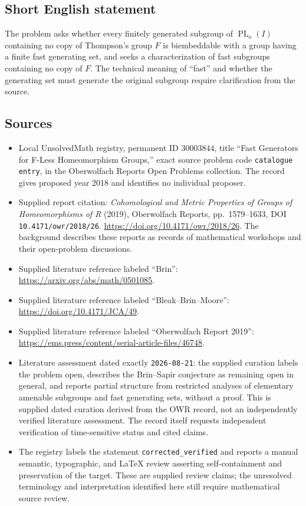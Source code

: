 \documentclass[11pt]{article}
\begin{document}
\subsection{Short English statement}
The problem asks whether every finitely generated subgroup of \(\operatorname{PL}_o(I)\) containing no copy of Thompson's group \(F\) is biembeddable with a group having a finite fast generating set, and seeks a characterization of fast subgroups containing no copy of \(F\). The technical meaning of ``fast'' and whether the generating set must generate the original subgroup require clarification from the source.
\subsection{Sources}
\begin{itemize}
\item Local UnsolvedMath registry, permanent ID \(30003844\), title ``Fast Generators for F-Less Homeomorphism Groups,'' exact source problem code \texttt{catalogue entry}, in the Oberwolfach Reports Open Problems collection. The record gives proposed year 2018 and identifies no individual proposer.
\item Supplied report citation: \emph{Cohomological and Metric Properties of Groups of Homeomorphisms of R} (2019), Oberwolfach Reports, pp.\ 1579--1633, DOI \texttt{10.4171/owr/2018/26}. \url{https://doi.org/10.4171/owr/2018/26}. The background describes these reports as records of mathematical workshops and their open-problem discussions.
\item Supplied literature reference labeled ``Brin'': \url{https://arxiv.org/abs/math/0501085}.
\item Supplied literature reference labeled ``Bleak--Brin--Moore'': \url{https://doi.org/10.4171/JCA/49}.
\item Supplied literature reference labeled ``Oberwolfach Report 2019'': \url{https://ems.press/content/serial-article-files/46748}.
\item Literature assessment dated exactly \texttt{2026-08-21}: the supplied curation labels the problem open, describes the Brin--Sapir conjecture as remaining open in general, and reports partial structure from restricted analyses of elementary amenable subgroups and fast generating sets, without a proof. This is supplied dated curation derived from the OWR record, not an independently verified literature assessment. The record itself requests independent verification of time-sensitive status and cited claims.
\item The registry labels the statement \texttt{corrected\_verified} and reports a manual semantic, typographic, and LaTeX review asserting self-containment and preservation of the target. These are supplied review claims; the unresolved terminology and interpretation identified here still require mathematical source review.
\end{itemize}
\end{document}
